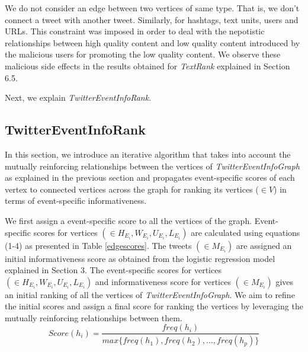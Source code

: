 We do not consider an edge between two vertices of same type. That is, we don't connect a tweet with another tweet. Similarly, for hashtags, text units, users and URLs. This constraint was imposed in order to deal with the nepotistic relationships between high quality content and low quality content introduced by the malicious users for promoting the low quality content. We observe these malicious side effects in the results obtained for \textit{TextRank} explained in Section 6.5.  

Next, we explain \textit{TwitterEventInfoRank}.


\subsection{TwitterEventInfoRank\label{twitterEventInfoRank}}
In this section, we introduce an iterative algorithm that takes into account the mutually reinforcing relationships between the vertices of \textit{TwitterEventInfoGraph} as explained in the previous section and propagates event-specific scores of each vertex to connected vertices across the graph for ranking its vertices ($\scriptstyle \in V$) in terms of event-specific informativeness.

We first assign a event-specific score to all the vertices of the graph. Event-specific scores for vertices $(\in H_{E_{i}}, W_{E_{i}}, U_{E_{i}}, L_{E_{i}})$ are calculated using equations (1-4) as presented in Table \ref{edgescores}. The tweets  $(\in M_{E_{i}})$ are assigned an initial informativeness score as obtained from the logistic regression model explained in Section 3. The event-specific scores for vertices $(\in H_{E_{i}}, W_{E_{i}}, U_{E_{i}}, L_{E_{i}})$ and informativeness score for vertices $(\in M_{E_{i}})$ gives an initial ranking of all the vertices of \textit{TwitterEventInfoGraph}. We aim to refine the initial scores and assign a final score for ranking the vertices by leveraging the mutually reinforcing relationships between them.
\begin{equation}
Score(h_{i}) = \frac{freq(h_{i})}{max\{freq(h_{1}),freq(h_{2}),...,freq(h_{p})\}}
\end{equation}

